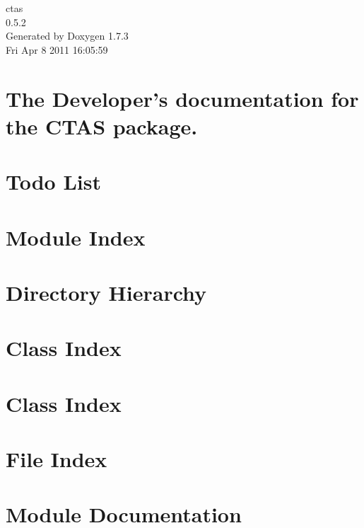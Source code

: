 \documentclass[a4paper]{article}
\begin{document}
\hypersetup{pageanchor=false}
\begin{titlepage}
\vspace*{7cm}
\begin{center}
{\Large ctas \\[1ex]\large 0.5.2 }\\
\vspace*{1cm}
{\large Generated by Doxygen 1.7.3}\\
\vspace*{0.5cm}
{\small Fri Apr 8 2011 16:05:59}\\
\end{center}
\end{titlepage}
\tableofcontents
{}
\hypersetup{pageanchor=true}
\section{The Developer's documentation for the CTAS package.}
\label{index}\hypertarget{index}{}
\section{Todo List}
\label{todo}
\hypertarget{todo}{}

\section{Module Index}

\section{Directory Hierarchy}

\section{Class Index}

\section{Class Index}

\section{File Index}

\section{Module Documentation}











\end{document}
